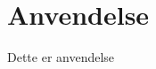 \documentclass[../SRP.tex]{subfiles}
\begin{document}
\chapter{Anvendelse}

Dette er anvendelse
\end{document}
